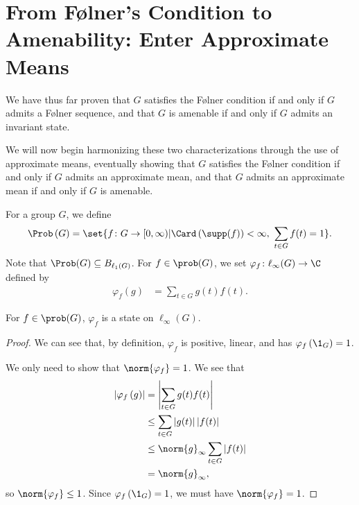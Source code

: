 \section{From Følner's Condition to Amenability: Enter Approximate Means}%
We have thus far proven that $G$ satisfies the Følner condition if and only if $G$ admits a Følner sequence, and that $G$ is amenable if and only if $G$ admits an invariant state.\newline

We will now begin harmonizing these two characterizations through the use of approximate means, eventually showing that $G$ satisfies the Følner condition if and only if $G$ admits an approximate mean, and that $G$ admits an approximate mean if and only if $G$ is amenable.
\begin{definition}\label{def:state_on_prob_g}
  For a group $G$, we define
  \begin{align*}
    \Prob\left(G\right) = \set{f\colon G\rightarrow [0,\infty) | \Card\left(\supp(f)\right)  < \infty,~\sum_{t\in G}f(t) = 1}.
  \end{align*}
  Note that $\Prob(G) \subseteq B_{\ell_1\left(G\right)}$. For $f\in \prob(G)$, we set $\varphi_f\colon \ell_{\infty}(G)\rightarrow \C$ defined by
  \begin{align*}
    \varphi_f\left(g\right) &= \sum_{t\in G}g(t)f(t).
  \end{align*}
\end{definition}
\begin{fact}\label{fact:prob_g_state}
  For $f\in \prob(G)$, $\varphi_f$ is a state on $\ell_{\infty}\left(G\right)$.
\end{fact}
\begin{proof}
We can see that, by definition, $\varphi_f$ is positive, linear, and has $\varphi_f\left(\1_{G}\right) = 1$.\newline

We only need to show that $\norm{\varphi_f} = 1$. We see that
\begin{align*}
  \left\vert \varphi_f\left(g\right) \right\vert &= \left\vert \sum_{t\in G}g(t)f(t) \right\vert\\
                                                 &\leq \sum_{t\in G}\left\vert g(t) \right\vert\left\vert f(t) \right\vert\\
                                                 &\leq \norm{g}_{\infty}\sum_{t\in G}\left\vert f(t) \right\vert\\
                                                 &= \norm{g}_{\infty},
\end{align*}
so $\norm{\varphi_f} \leq 1$. Since $\varphi_f\left(\1_G\right) = 1$, we must have $\norm{\varphi_f} = 1$.
\end{proof}
